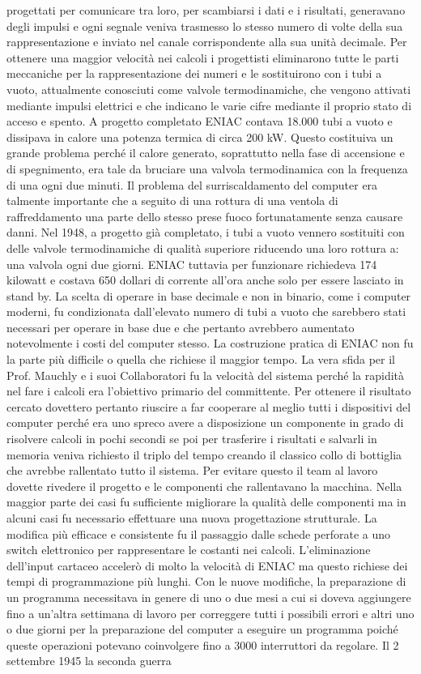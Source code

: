 progettati per comunicare tra loro, per scambiarsi i dati e i risultati, generavano degli impulsi e ogni segnale veniva trasmesso lo stesso numero di volte della sua rappresentazione e inviato nel canale corrispondente alla sua unità decimale.  Per ottenere una maggior velocità nei calcoli i progettisti eliminarono tutte le parti meccaniche per la rappresentazione dei numeri e le sostituirono con i tubi a vuoto, attualmente conosciuti come valvole termodinamiche, che vengono attivati mediante impulsi elettrici e che indicano le varie cifre mediante il proprio stato di acceso e spento.  A progetto completato ENIAC contava 18.000 tubi a vuoto e dissipava in calore una potenza termica di circa 200 kW. Questo costituiva un grande problema perché il calore generato, soprattutto nella fase di accensione e di spegnimento, era tale da bruciare una valvola termodinamica con la frequenza di una ogni due minuti. Il problema del surriscaldamento del computer era talmente importante che a seguito di una rottura di una ventola di raffreddamento una parte dello stesso prese fuoco fortunatamente senza causare danni. Nel 1948, a progetto già completato, i tubi a vuoto vennero sostituiti con delle valvole termodinamiche di qualità superiore riducendo una loro rottura a: una valvola ogni due giorni. ENIAC tuttavia per funzionare richiedeva 174 kilowatt e costava 650 dollari di corrente all’ora anche solo per essere lasciato in stand by. La scelta di operare in base decimale e non in binario, come i computer moderni, fu condizionata dall’elevato numero di tubi a vuoto che sarebbero stati necessari per operare in base due e che pertanto avrebbero aumentato notevolmente i costi del computer stesso. La costruzione pratica di ENIAC non fu la parte più difficile o quella che richiese il maggior tempo. La vera sfida per il Prof. Mauchly e i suoi Collaboratori fu la velocità del sistema perché la rapidità nel fare i calcoli era l’obiettivo primario del committente. Per ottenere il risultato cercato dovettero pertanto riuscire a far cooperare al meglio tutti i dispositivi del computer perché era uno spreco avere a disposizione un componente in grado di risolvere calcoli in pochi secondi se poi per trasferire i risultati e salvarli in memoria veniva richiesto il triplo del tempo creando il classico collo di bottiglia che avrebbe rallentato tutto il sistema. Per evitare questo il team al lavoro dovette rivedere il progetto e le componenti che rallentavano la macchina. Nella maggior parte dei casi fu sufficiente migliorare la qualità delle componenti ma in alcuni casi fu necessario effettuare una nuova progettazione strutturale.  La modifica più efficace e consistente fu il passaggio dalle schede perforate a uno switch elettronico per rappresentare le costanti nei calcoli. L’eliminazione dell’input cartaceo accelerò di molto la velocità di ENIAC ma questo richiese dei tempi di programmazione più lunghi. Con le nuove modifiche, la preparazione di un programma necessitava in genere di uno o due mesi a cui si doveva aggiungere fino a un’altra settimana di lavoro per correggere tutti i possibili errori e altri uno o due giorni per la preparazione del computer a eseguire un programma poiché queste operazioni potevano coinvolgere fino a 3000 interruttori da regolare. Il 2 settembre 1945 la seconda guerra 